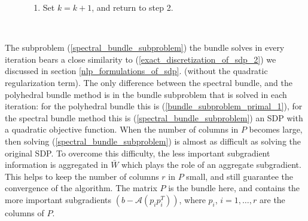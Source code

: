 \documentclass[12pt]{kluwer}
\begin{document}
\begin{article}
\begin{figure}
{\begin{minipage}{\textwidth}
\begin{enumerate}
Finally update the bundle $P$, and the aggregate matrix $\bar{W}$ as follows:
\begin{equation}
\label{update_bundle_agg}
\begin{array}{ccc}
P^{k+1} & = & \mbox{orth}([P^kQ_1,v^{k+1}]) \\
\bar{W}^{k+1} & =  & \frac{1}{\alpha^k + \mbox{Trace}(\Lambda_2)}
(\alpha^k \bar{W}^k + P^kQ_2\Lambda_2(P^kQ_2)^T)
\end{array}
\end{equation}
\item Set $k=k+1$, and return to step 2.
\end{enumerate}
\end{minipage}
}  \\
\end{figure}
The subproblem (\ref{spectral_bundle_subproblem}) the bundle solves in every iteration bears
a close similarity to (\ref{exact_discretization_of_sdp_2}) we discussed in section \ref{nlp_formulations_of_sdp}.
(without the quadratic regularization term).
The only difference between the spectral bundle, and the polyhedral bundle method is in the
bundle subproblem that is solved in each iteration: for the polyhedral bundle this is 
(\ref{bundle_subproblem_primal_1}), for the spectral bundle method this is (\ref{spectral_bundle_subproblem})
an SDP with a quadratic objective function.
When the number of columns in $P$ becomes large, then solving (\ref{spectral_bundle_subproblem}) is
almost as difficult as solving the original SDP. To overcome this difficulty, the less important
subgradient information is aggregated in $\bar{W}$ which plays the role of an aggregate subgradient.
This helps to keep the number of columns $r$ in $P$ small, and still guarantee the convergence
of the algorithm.
The matrix $P$ is the bundle here, and contains the more important subgradients $(b - \mathcal{A}(p_ip_i^T))$,
where $p_i$, $i=1,\ldots,r$ are the columns of $P$. 


\end{article}
\end{document}
